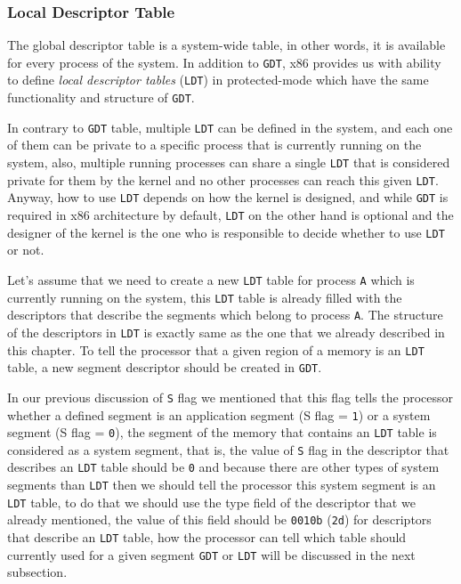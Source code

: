 \subsubsection{Local Descriptor Table}\label{local-descriptor-table}

The global descriptor table is a system-wide table, in other words, it
is available for every process of the system. In addition to
\lstinline!GDT!, x86 provides us with ability to define \emph{local
descriptor tables} (\lstinline!LDT!) in protected-mode which have the
same functionality and structure of \lstinline!GDT!.

In contrary to \lstinline!GDT! table, multiple \lstinline!LDT! can be
defined in the system, and each one of them can be private to a specific
process that is currently running on the system, also, multiple running
processes can share a single \lstinline!LDT! that is considered private
for them by the kernel and no other processes can reach this given
\lstinline!LDT!. Anyway, how to use \lstinline!LDT! depends on how the
kernel is designed, and while \lstinline!GDT! is required in x86
architecture by default, \lstinline!LDT! on the other hand is optional
and the designer of the kernel is the one who is responsible to decide
whether to use \lstinline!LDT! or not.

Let's assume that we need to create a new \lstinline!LDT! table for
process \lstinline!A! which is currently running on the system, this
\lstinline!LDT! table is already filled with the descriptors that
describe the segments which belong to process \lstinline!A!. The
structure of the descriptors in \lstinline!LDT! is exactly same as the
one that we already described in this chapter. To tell the processor
that a given region of a memory is an \lstinline!LDT! table, a new
segment descriptor should be created in \lstinline!GDT!.

In our previous discussion of \lstinline!S! flag we mentioned that this
flag tells the processor whether a defined segment is an application
segment (S flag = \lstinline!1!) or a system segment (S flag =
\lstinline!0!), the segment of the memory that contains an
\lstinline!LDT! table is considered as a system segment, that is, the
value of \lstinline!S! flag in the descriptor that describes an
\lstinline!LDT! table should be \lstinline!0! and because there are
other types of system segments than \lstinline!LDT! then we should tell
the processor this system segment is an \lstinline!LDT! table, to do
that we should use the type field of the descriptor that we already
mentioned, the value of this field should be \lstinline!0010b!
(\lstinline!2d!) for descriptors that describe an \lstinline!LDT! table,
how the processor can tell which table should currently used for a given
segment \lstinline!GDT! or \lstinline!LDT! will be discussed in the next
subsection.

